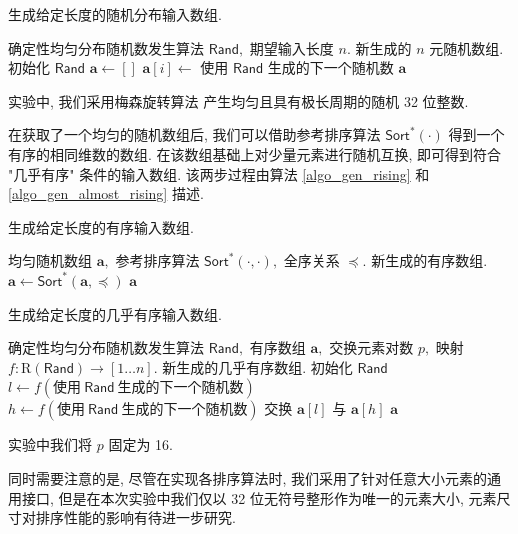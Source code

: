 \documentclass[12pt]{article}
\begin{document}
\begin{algorithm}[H]
\caption{生成给定长度的随机分布输入数组.}
\label{algo_gen_rand}
\begin{algorithmic}[1]
\Require 确定性均匀分布随机数发生算法 $\mathsf{Rand},$ 期望输入长度 $n.$
\Ensure 新生成的 $n$ 元随机数组.
\State 初始化 $\mathsf{Rand}$
\State $\bm{a} \gets []$
    \State $\bm{a}[i] \gets$ 使用 $\mathsf{Rand}$ 生成的下一个随机数
\EndFor
\State \Return $\bm{a}$
\end{algorithmic}
\end{algorithm}

实验中, 我们采用梅森旋转算法 \cite{bib_mersenne_randgen} 产生均匀且具有极长周期的随机 32 位整数.

在获取了一个均匀的随机数组后, 我们可以借助参考排序算法 $\mathsf{Sort}^*(\cdot)$ 得到一个有序的相同维数的数组. 在该数组基础上对少量元素进行随机互换, 即可得到符合 "几乎有序" 条件的输入数组. 该两步过程由算法 \ref{algo_gen_rising} 和 \ref{algo_gen_almost_rising} 描述.

\begin{algorithm}[H]
\caption{生成给定长度的有序输入数组.}
\label{algo_gen_rising}
\begin{algorithmic}[1]
\Require 均匀随机数组 $\bm{a},$ 参考排序算法 $\mathsf{Sort}^*(\cdot, \cdot),$ 全序关系 $\preceq.$
\Ensure 新生成的有序数组.
\State $\bm{a} \gets \mathsf{Sort}^*(\bm{a}, \preceq)$
\State \Return $\bm{a}$
\end{algorithmic}
\end{algorithm}
\begin{algorithm}
\caption{生成给定长度的几乎有序输入数组.}
\label{algo_gen_almost_rising}
\begin{algorithmic}[1]
\Require 确定性均匀分布随机数发生算法 $\mathsf{Rand},$ 有序数组 $\bm{a},$ 交换元素对数 $p,$ 映射 $f: \mathrm{R}(\mathsf{Rand}) \to [1 \dots n].$
\Ensure 新生成的几乎有序数组.
\State 初始化 $\mathsf{Rand}$
    \State $l \gets f(\text{使用}\ \mathsf{Rand}\ \text{生成的下一个随机数})$
    \State $h \gets f(\text{使用}\ \mathsf{Rand}\ \text{生成的下一个随机数})$
    \State 交换 $\bm{a}[l]$ 与 $\bm{a}[h]$
\EndFor
\State \Return $\bm{a}$
\end{algorithmic}
\end{algorithm}

实验中我们将 $p$ 固定为 16.

同时需要注意的是, 尽管在实现各排序算法时, 我们采用了针对任意大小元素的通用接口, 但是在本次实验中我们仅以 32 位无符号整形作为唯一的元素大小, 元素尺寸对排序性能的影响有待进一步研究.
\end{document}
